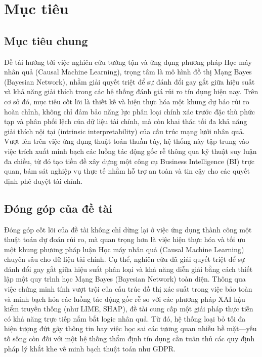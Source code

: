 \newpage
\section{Mục tiêu}

\subsection{Mục tiêu chung}

Đề tài hướng tới việc nghiên cứu tường tận và ứng dụng phương pháp Học máy nhân quả (Causal Machine Learning), trọng tâm là mô hình đồ thị Mạng Bayes (Bayesian Network), nhằm giải quyết triệt để sự đánh đổi gay gắt giữa hiệu suất và khả năng giải thích trong các hệ thống đánh giá rủi ro tín dụng hiện nay. Trên cơ sở đó, mục tiêu cốt lõi là thiết kế và hiện thực hóa một khung dự báo rủi ro hoàn chỉnh, không chỉ đảm bảo năng lực phân loại chính xác trước đặc thù phức tạp và phân phối lệch của dữ liệu tài chính, mà còn khai thác tối đa khả năng giải thích nội tại (intrinsic interpretability) của cấu trúc mạng lưới nhân quả. Vượt lên trên việc ứng dụng thuật toán thuần túy, hệ thống này tập trung vào việc trích xuất minh bạch các luồng tác động gốc rễ thông qua kỹ thuật suy luận đa chiều, từ đó tạo tiền đề xây dựng một công cụ Business Intelligence (BI) trực quan, bám sát nghiệp vụ thực tế nhằm hỗ trợ an toàn và tin cậy cho các quyết định phê duyệt tài chính.

\subsection{Đóng góp của đề tài}

Đóng góp cốt lõi của đề tài không chỉ dừng lại ở việc ứng dụng thành công một thuật toán dự đoán rủi ro, mà quan trọng hơn là việc hiện thực hóa và tối ưu một khung phương pháp luận Học máy nhân quả (Causal Machine Learning) chuyên sâu cho dữ liệu tài chính. Cụ thể, nghiên cứu đã giải quyết triệt để sự đánh đổi gay gắt giữa hiệu suất phân loại và khả năng diễn giải bằng cách thiết lập một quy trình học Mạng Bayes (Bayesian Network) toàn diện. Thông qua việc chứng minh tính vượt trội của cấu trúc đồ thị xác suất trong việc bảo toàn và minh bạch hóa các luồng tác động gốc rễ so với các phương pháp XAI hậu kiểm truyền thống (như LIME, SHAP), đề tài cung cấp một giải pháp thực tiễn có khả năng trực tiếp nắm bắt logic nhân quả. Từ đó, hệ thống loại bỏ tối đa hiện tượng đứt gãy thông tin hay việc học sai các tương quan nhiễu bề mặt—yếu tố sống còn đối với một hệ thống thẩm định tín dụng cần tuân thủ các quy định pháp lý khắt khe về minh bạch thuật toán như GDPR.

